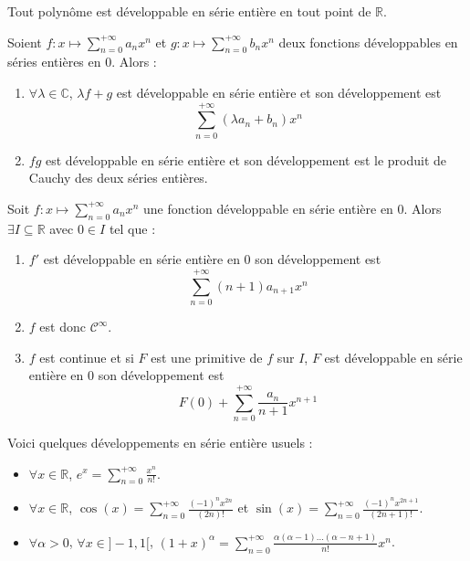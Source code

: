 
  \begin{example}
    Tout polynôme est développable en série entière en tout point de $\mathbb{R}$.
  \end{example}

  \begin{proposition}
    Soient $f : x \mapsto \sum_{n=0}^{+\infty} a_n x^n$ et $g : x \mapsto \sum_{n=0}^{+\infty} b_n x^n$ deux fonctions développables en séries entières en $0$. Alors :
    \begin{enumerate}[label={\bfseries(\roman*)}]
      \item $\forall \lambda \in \mathbb{C}$, $\lambda f + g$ est développable en série entière et son développement est
      \[ \sum_{n=0}^{+\infty} (\lambda a_n + b_n) x^n \]
      \item $fg$ est développable en série entière et son développement est le produit de Cauchy des deux séries entières.
    \end{enumerate}
  \end{proposition}

  \begin{proposition}
    Soit $f : x \mapsto \sum_{n=0}^{+\infty} a_n x^n$ une fonction développable en série entière en $0$. Alors $\exists I \subseteq \mathbb{R}$ avec $0 \in I$ tel que :
    \begin{enumerate}[label={\bfseries(\roman*)}]
      \item $f'$ est développable en série entière en $0$ son développement est
      \[ \sum_{n=0}^{+\infty} (n+1) a_{n+1} x^n \]
      \item $f$ est donc $\mathcal{C}^\infty$.
      \item $f$ est continue et si $F$ est une primitive de $f$ sur $I$, $F$ est développable en série entière en $0$ son développement est
      \[ F(0) + \sum_{n=0}^{+\infty} \frac{a_n}{n+1} x^{n+1} \]
    \end{enumerate}
  \end{proposition}

  \begin{example}
    Voici quelques développements en série entière usuels :
    \begin{itemize}
      \item $\forall x \in \mathbb{R}$, $e^x = \sum_{n=0}^{+\infty} \frac{x^n}{n!}$.
      \item $\forall x \in \mathbb{R}$, $\cos(x) = \sum_{n=0}^{+\infty} \frac{(-1)^n x^{2n}}{(2n)!}$ et $\sin(x) = \sum_{n=0}^{+\infty} \frac{(-1)^n x^{2n+1}}{(2n+1)!}$.
      \item $\forall \alpha > 0$, $\forall x \in ]-1,1[$, $(1 + x)^\alpha = \sum_{n=0}^{+\infty} \frac{\alpha(\alpha - 1) \dots (\alpha - n + 1)}{n!} x^n$.
    \end{itemize}
  \end{example}

